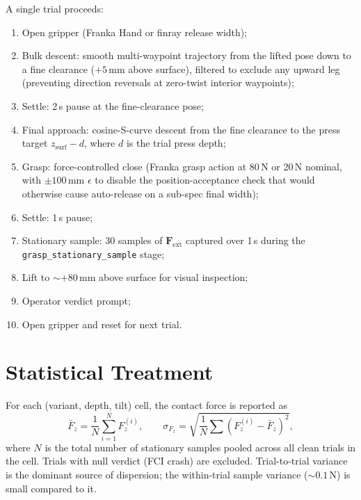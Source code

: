 A single trial proceeds:
\begin{enumerate}
  \item Open gripper (Franka Hand or finray release width);
  \item Bulk descent: smooth multi-waypoint trajectory from the lifted pose
        down to a fine clearance ($+5$\,mm above surface), filtered to
        exclude any upward leg (preventing direction reversals at zero-twist
        interior waypoints);
  \item Settle: 2\,s pause at the fine-clearance pose;
  \item Final approach: cosine-S-curve descent from the fine clearance to
        the press target $z_{\text{surf}} - d$, where $d$ is the trial press
        depth;
  \item Grasp: force-controlled close (Franka grasp action at 80\,N or
        20\,N nominal, with $\pm 100$\,mm $\epsilon$ to disable the
        position-acceptance check that would otherwise cause auto-release
        on a sub-spec final width);
  \item Settle: 1\,s pause;
  \item Stationary sample: 30 samples of $\mathbf{F}_{\text{ext}}$
        captured over 1\,s during the \texttt{grasp\_stationary\_sample}
        stage;
  \item Lift to $\sim +80$\,mm above surface for visual inspection;
  \item Operator verdict prompt;
  \item Open gripper and reset for next trial.
\end{enumerate}

\section{Statistical Treatment}

For each (variant, depth, tilt) cell, the contact force is reported as
\begin{equation}
  \bar{F}_z = \frac{1}{N}\sum_{i=1}^{N} F_z^{(i)}, \qquad
  \sigma_{F_z} = \sqrt{\frac{1}{N}\sum (F_z^{(i)} - \bar{F}_z)^2},
\end{equation}
where $N$ is the total number of stationary samples pooled across all
clean trials in the cell. Trials with null verdict (FCI crash) are
excluded. Trial-to-trial variance is the dominant source of dispersion;
the within-trial sample variance ($\sim 0.1$\,N) is small compared to it.
